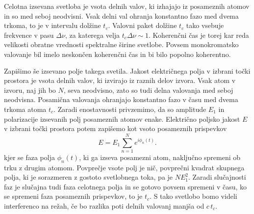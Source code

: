 Celotna izsevana svetloba je vsota delnih valov, ki izhajajo iz posameznih
atomov in so med seboj neodvisni. Vsak delni val ohranja konstantno fazo
med dvema trkoma, to je v intervalu dolžine $t_{c}$. Valovni paket dolžine 
$t_{c}$ tako vsebuje frekvence v pasu $\Delta \nu$,
za katerega velja $t_{c}\Delta\nu\sim1$. Koherenčni čas je torej
kar reda velikosti obratne vrednosti spektralne širine svetlobe. Povsem
monokromatsko valovanje bil imelo neskončen koherenčni čas in bi bilo
popolno koherentno.

Zapišimo še izsevano polje takega svetila. 
Jakost električnega polja v izbrani točki prostora je vsota delnih
valov, ki izvirajo iz raznih delov izvora. Vsak atom v izvoru, naj
jih bo $N$, seva neodvisno, zato so tudi delna valovanja med seboj
neodvisna. Posamična valovanja ohranjajo konstantno fazo v času med
dvema trkoma atoma $t_{c}$. Zaradi enostavnosti privzemimo,
da so amplitude $E_{1}$ in polarizacije izsevanih polj posameznih atomov enake. 
Električno poljsko jakost $E$ v izbrani točki prostora potem 
zapišemo kot vsoto posameznih prispevkov
\begin{equation}
E=E_{1}\sum_{n=1}^{N}e^{i\phi_{n}(t)}.
\label{eq:amplituda-random}
\end{equation}
kjer se faza polja $\phi_{n}(t)$, ki ga izseva posamezni atom, naključno
spremeni ob trku z drugim atomom. Povprečje vsote polj je nič, 
povprečni kvadrat skupnega polja, ki je sorazmeren
z gostoto svetlobnega toka, pa je $NE_{1}^{2}$. Zaradi slučajnosti faz je 
slučajna tudi faza celotnega polja in se gotovo povsem spremeni v času, ko se
spremeni faza posameznih prispevkov, to je $t_{c}$. S tako svetlobo bomo videli 
interferenco na režah, če bo razlika poti delnih valovanj manjša od $c\, t_{c}$.

